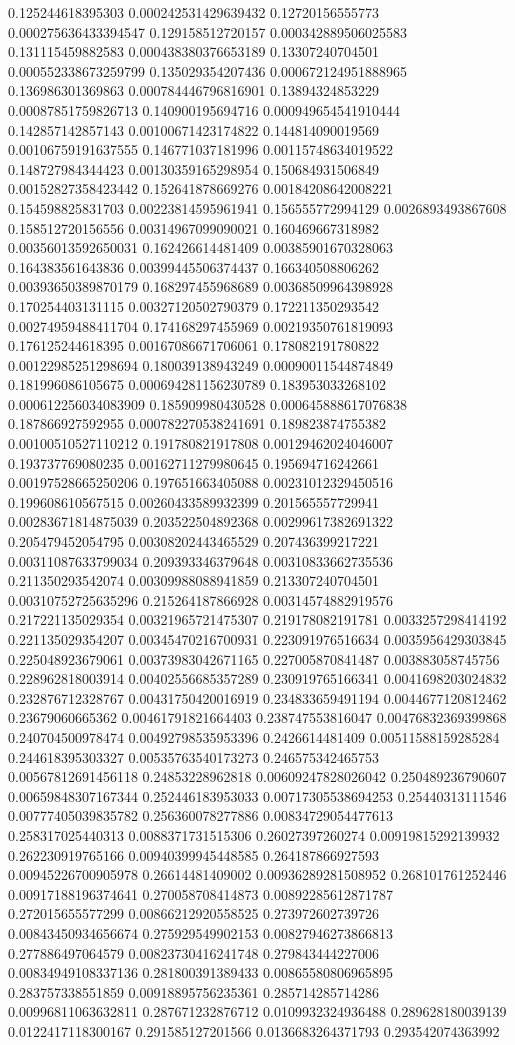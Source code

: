 \begin{table}
\begin{tabu}
\begin{sparkline}{10}
0.125244618395303 0.000242531429639432 0.12720156555773 0.000275636433394547 0.129158512720157 0.000342889506025583 0.131115459882583 0.000438380376653189 0.13307240704501 0.000552338673259799 0.135029354207436 0.000672124951888965 0.136986301369863 0.000784446796816901 0.13894324853229 0.00087851759826713 0.140900195694716 0.000949654541910444 0.142857142857143 0.00100671423174822 0.144814090019569 0.00106759191637555 0.146771037181996 0.00115748634019522 0.148727984344423 0.00130359165298954 0.150684931506849 0.00152827358423442 0.152641878669276 0.00184208642008221 0.154598825831703 0.00223814595961941 0.156555772994129 0.0026893493867608 0.158512720156556 0.00314967099090021 0.160469667318982 0.00356013592650031 0.162426614481409 0.00385901670328063 0.164383561643836 0.00399445506374437 0.166340508806262 0.00393650389870179 0.168297455968689 0.00368509964398928 0.170254403131115 0.00327120502790379 0.172211350293542 0.00274959488411704 0.174168297455969 0.00219350761819093 0.176125244618395 0.00167086671706061 0.178082191780822 0.00122985251298694 0.180039138943249 0.00090011544874849 0.181996086105675 0.000694281156230789 0.183953033268102 0.000612256034083909 0.185909980430528 0.000645888617076838 0.187866927592955 0.000782270538241691 0.189823874755382 0.00100510527110212 0.191780821917808 0.00129462024046007 0.193737769080235 0.00162711279980645 0.195694716242661 0.00197528665250206 0.197651663405088 0.00231012329450516 0.199608610567515 0.00260433589932399 0.201565557729941 0.00283671814875039 0.203522504892368 0.00299617382691322 0.205479452054795 0.00308202443465529 0.207436399217221 0.00311087633799034 0.209393346379648 0.00310833662735536 0.211350293542074 0.00309988088941859 0.213307240704501 0.00310752725635296 0.215264187866928 0.00314574882919576 0.217221135029354 0.00321965721475307 0.219178082191781 0.0033257298414192 0.221135029354207 0.00345470216700931 0.223091976516634 0.0035956429303845 0.225048923679061 0.00373983042671165 0.227005870841487 0.003883058745756 0.228962818003914 0.00402556685357289 0.230919765166341 0.0041698203024832 0.232876712328767 0.00431750420016919 0.234833659491194 0.0044677120812462 0.23679060665362 0.00461791821664403 0.238747553816047 0.00476832369399868 0.240704500978474 0.00492798535953396 0.2426614481409 0.00511588159285284 0.244618395303327 0.00535763540173273 0.246575342465753 0.00567812691456118 0.24853228962818 0.00609247828026042 0.250489236790607 0.00659848307167344 0.252446183953033 0.00717305538694253 0.25440313111546 0.00777405039835782 0.256360078277886 0.00834729054477613 0.258317025440313 0.0088371731515306 0.26027397260274 0.00919815292139932 0.262230919765166 0.00940399945448585 0.264187866927593 0.00945226700905978 0.26614481409002 0.00936289281508952 0.268101761252446 0.00917188196374641 0.270058708414873 0.00892285612871787 0.272015655577299 0.00866212920558525 0.273972602739726 0.00843450934656674 0.275929549902153 0.00827946273866813 0.277886497064579 0.00823730416241748 0.279843444227006 0.00834949108337136 0.281800391389433 0.00865580806965895 0.283757338551859 0.00918895756235361 0.285714285714286 0.00996811063632811 0.287671232876712 0.0109932324936488 0.289628180039139 0.0122417118300167 0.291585127201566 0.0136683264371793 0.293542074363992 
\end{sparkline}
\end{tabu}
\end{table}
